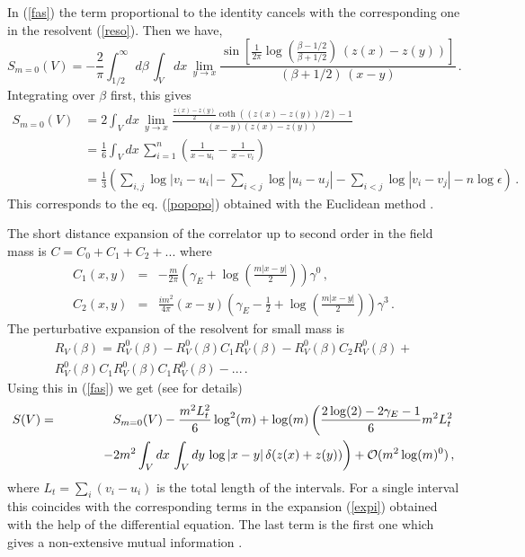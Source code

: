 \documentclass[11pt]{article}
\def\nn{\nonumber}
\begin{document}
 In (\ref{fas}) the term proportional to the identity cancels with the corresponding one in the resolvent (\ref{reso}). Then we have, 
\begin{equation}
S_{m=0}(V)=-\frac{2}{\pi}\int^\infty_{1/2} d\beta\, \int_V dx\, \lim_{y\rightarrow x}  \frac{\sin\left[ \frac{1}{2\pi} \log\left(\frac{\beta-1/2}{\beta+1/2}\right)\, (z(x)-z(y)) \right]}{(\beta+1/2)\,(x-y)}\,.
\end{equation}  
 Integrating over $\beta$ first, this gives
\begin{align}
S_{m=0}(V)&=2\int_V dx\, \lim_{y\rightarrow x}  \frac{\frac{z(x)-z(y)}{2}\coth((z(x)-z(y))/2)-1}{(x-y)(z(x)-z(y))}\nn\\
& =\frac{1}{6}\int_V dx\,\sum_{i=1}^n \left(\frac{1}{x-u_i}-\frac{1}{x-v_i}\right)\nonumber\\
& =\frac{1}{3} \left( \sum_{i,j}\log|v_i-u_i|-\sum_{i<j} \log|u_i-u_j| -\sum_{i<j} \log|v_i-v_j|-n \log \epsilon \right)\,.\label{sesen}
\end{align}
 This corresponds to the eq. (\ref{popopo}) obtained with the Euclidean method \cite{fermion}.

The short distance expansion of the correlator up to second order in the field mass is $C=C_0+C_1+C_2+...$ where
\begin{eqnarray}
C_1 (x,y)&=&-\frac{m}{2\pi}\left(\gamma_E+\log\left(\frac{m|x-y|}{2}\right)\right) \gamma^0 \,,\\
C_2 (x,y)&=&\frac{i m^2}{4\pi} (x-y) \left(\gamma_E -\frac{1}{2} +\log\left(\frac{m|x-y|}{2}\right) \right) \gamma^3\,.
\end{eqnarray}
The perturbative expansion of the resolvent for small mass is 
\begin{multline}
R_V(\beta)=R_V^0(\beta)-R_V^0(\beta)C_1 R_V^0(\beta)-R_V^0(\beta)C_2 R_V^0(\beta)+\\
R_V^0(\beta)C_1 R_V^0(\beta)C_1 R_V^0(\beta)-...\,.
\label{financiar}
\end{multline}
Using this in (\ref{fas}) we get (see \cite{futuro} for details)
\begin{eqnarray}
S(V)&=&S_{m=0}(V)-\frac{m^2 L_t^2}{6}  \log^2(m)+\log(m)\left(\frac{2\log(2)-2\gamma_E-1}{6} m^2 L_t^2\right. \\
 &&\hspace{1cm}\left. - 2 m^2  \int_V dx\,\int_V dy\, \log|x-y|\, \delta(z(x)+z(y))\right)+{\cal O}(m^2 \log(m)^0) \nonumber \,,
\end{eqnarray}
where $L_t=\sum_i (v_i-u_i)$ is the total length of the intervals. For a single interval this coincides with the corresponding terms in the expansion (\ref{expi}) obtained with the help of the differential equation. The last term is the first one which gives a non-extensive mutual information \cite{remarks}.
\end{document}

